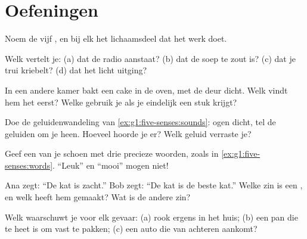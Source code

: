 \section{Oefeningen}

\begin{exercise}[$\star$]\label{exo:g1:five-senses:1}
Noem de vijf , en bij elk het lichaamsdeel dat het werk
doet.
\end{exercise}

\begin{exercise}[$\star$]\label{exo:g1:five-senses:2}
Welk  vertelt je: (a) dat de radio aanstaat? (b) dat de soep
te zout is? (c) dat je trui kriebelt? (d) dat het licht uitging?
\end{exercise}

\begin{exercise}[$\star$]\label{exo:g1:five-senses:3}
In een andere kamer bakt een cake in de oven, met de deur dicht.
Welk  vindt hem het eerst? Welke  gebruik je als je
eindelijk een stuk krijgt?
\end{exercise}

\begin{exercise}[$\star$]\label{exo:g1:five-senses:4}
Doe de geluidenwandeling van \cref{ex:g1:five-senses:sounds}: ogen
dicht, tel de geluiden om je heen. Hoeveel hoorde je er? Welk geluid
verraste je?
\end{exercise}

\begin{exercise}[$\star$]\label{exo:g1:five-senses:5}
Geef een  van je schoen met drie precieze woorden, zoals in
\cref{ex:g1:five-senses:words}. ``Leuk'' en ``mooi'' mogen niet!
\end{exercise}

\begin{exercise}[$\star$]\label{exo:g1:five-senses:6}
Ana zegt: ``De kat is zacht.'' Bob zegt: ``De kat is de beste kat.''
Welke zin is een , en welk  heeft hem gemaakt? Wat is
de andere zin?
\end{exercise}

\begin{exercise}[$\star$]\label{exo:g1:five-senses:7}
Welk  waarschuwt je voor elk gevaar: (a) rook ergens in het
huis; (b) een pan die te heet is om vast te pakken; (c) een auto die
van achteren aankomt?
\end{exercise}

